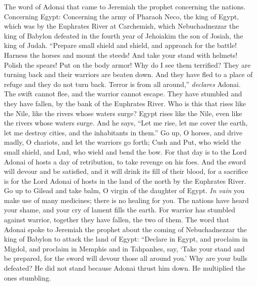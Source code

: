 \begin{biblechapter} %
 The word of Adonai that came to Jeremiah the prophet concerning the nations.
\verse Concerning Egypt: Concerning the army of Pharaoh Neco, the king of Egypt, which was by the Euphrates River at Carchemish, which Nebuchadnezzar the king of Babylon defeated in the fourth year of Jehoiakim the son of Josiah, the king of Judah.
\verse “Prepare small shield and shield, 
and approach for the battle!
\verse Harness the horses and mount the steeds! 
And take your stand with helmets! 
Polish the spears! 
Put on the body armor!
\verse Why do I see them terrified? 
They are turning back 
and their warriors are beaten down. 
And they have fled to a place of refuge 
and they do not turn back. 
Terror is from all around,” \textit{declares} Adonai.
\verse The swift cannot flee, 
and the warrior cannot escape. 
They have stumbled and they have fallen, 
by the bank of the Euphrates River.
\verse Who is this that rises like the Nile, 
like the rivers whose waters surge?
\verse Egypt rises like the Nile, 
even like the rivers whose waters surge. 
And he says, “Let me rise, 
let me cover the earth, 
let me destroy cities, 
and the inhabitants in them.”
\verse Go up, O horses, 
and drive madly, O chariots, 
and let the warriors go forth; 
Cush and Put, who wield the small shield, 
and Lud, who wield and bend the bow.
\verse For that day is to the Lord Adonai of hosts 
a day of retribution, 
to take revenge on his foes. 
And the sword will devour and be satisfied, 
and it will drink its fill of their blood, 
for a sacrifice is for the Lord Adonai of hosts 
in the land of the north by the Euphrates River.
\verse Go up to Gilead and take balm, 
O virgin of the daughter of Egypt. 
\textit{In vain} you make use of many medicines; 
there is no healing for you.
\verse The nations have heard your shame, 
and your cry of lament fills the earth. 
For warrior has stumbled against warrior, 
together they have fallen, the two of them.
\verse The word that Adonai spoke to Jeremiah the prophet about the coming of Nebuchadnezzar the king of Babylon to attack the land of Egypt:
\verse “Declare in Egypt, and proclaim in Migdol, 
and proclaim in Memphis and in Tahpanhes, 
say, ‘Take your stand and be prepared, 
for the sword will devour those all around you.’
\verse Why are your bulls defeated? 
He did not stand because Adonai thrust him down.
\verse He multiplied the ones stumbling. 

\end{biblechapter}
